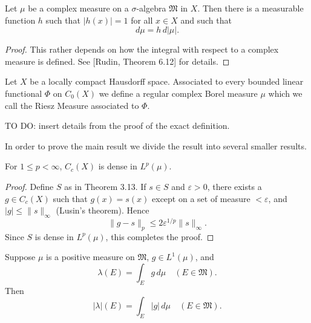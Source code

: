 \begin{theorem}
  \label{thm:polar_rep}
  Let $\mu$ be a complex measure on a $\sigma$-algebra $\mathfrak{M}$ in $X$. Then there is a measurable function $h$ such that $|h(x)| = 1$ for all $x \in X$ and such that
  \begin{equation}
    d\mu = h \, d|\mu|.
  \end{equation}
\end{theorem}

\begin{proof}
  This rather depends on how the integral with respect to a complex measure is defined.
  See [Rudin, Theorem 6.12] for details.
\end{proof}


\begin{definition}
  \label{def:riesz_measure}
  \notready
  Let $X$ be a locally compact Hausdorff space.
  Associated to every bounded linear functional $\Phi$ on $C_0(X)$ we define a regular complex Borel measure $\mu$ which we call the Riesz Measure associated to $\Phi$.

  TO DO: insert details from the proof of the exact definition.
\end{definition}

In order to prove the main result we divide the result into several smaller results.


\begin{theorem}[Rudin 3.14]
  \label{thm:Cc_dense_Lp}
  For $1 \leq p < \infty$, $C_c(X)$ is dense in $L^p(\mu)$.
\end{theorem}

\begin{proof}
  Define $S$ as in Theorem 3.13. If $s \in S$ and $\varepsilon > 0$, there exists a $g \in C_c(X)$ such that $g(x) = s(x)$ except on a set of measure $< \varepsilon$, and $|g| \leq \|s\|_\infty$ (Lusin's theorem).
  Hence
  \begin{equation}
    \|g - s\|_p \leq 2\varepsilon^{1/p}\|s\|_\infty.
  \end{equation}
  Since $S$ is dense in $L^p(\mu)$, this completes the proof.
\end{proof}

\begin{theorem}[Rudin 6.13]
  \label{thm:abs_integral}
  Suppose $\mu$ is a positive measure on $\mathfrak{M}$, $g \in L^1(\mu)$, and
  \begin{equation}
    \lambda(E) = \int_E g \, d\mu \quad (E \in \mathfrak{M}).
  \end{equation}
  Then
  \begin{equation}
    |\lambda|(E) = \int_E |g| \, d\mu \quad (E \in \mathfrak{M}).
  \end{equation}
\end{theorem}

